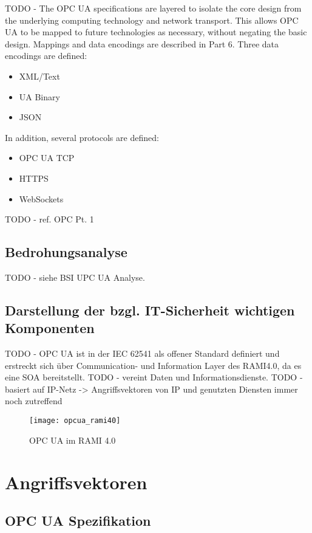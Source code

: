 TODO - The OPC UA specifications are layered to isolate the core design from the underlying computing technology and network transport. This allows OPC UA to be mapped to future technologies as necessary, without negating the basic design. Mappings and data encodings are described in Part 6. Three data encodings are defined:
\begin{itemize}
    \item XML/Text
    \item UA Binary
    \item JSON
\end{itemize}
In addition, several protocols are defined:
\begin{itemize}
    \item OPC UA TCP
    \item HTTPS
    \item WebSockets
\end{itemize}

TODO - ref. OPC Pt. 1

\subsection{Bedrohungsanalyse}
TODO - siehe BSI UPC UA Analyse.

\subsection{Darstellung der bzgl. IT-Sicherheit wichtigen Komponenten}


TODO - \ac{OPC UA} ist in der \ac{IEC} 62541 als offener Standard definiert und erstreckt sich über Communication- und Information Layer des \ac{RAMI4.0}, da es eine \ac{SOA} bereitstellt. 
TODO - vereint Daten und Informationsdienste. 
TODO - basiert auf IP-Netz -> Angriffsvektoren von IP und genutzten Diensten immer noch zutreffend

\begin{figure}[h]
    \centering
    \texttt{[image: opcua\_rami40]}
    \caption{OPC UA im RAMI 4.0}
    \label{Kap3:OPC UA im RAMI 4.0}
  \end{figure}
  
\clearpage

\section{Angriffsvektoren}
\subsection{\ac{OPC UA} Spezifikation}
